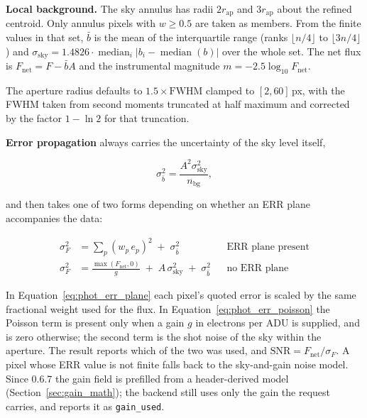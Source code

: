 \documentclass[11pt,a4paper]{article}
\newcommand{\code}[1]{\texttt{\small #1}}
\begin{document}
    \textbf{Local background.} The sky annulus has radii $2 r_{\text{ap}}$ and $3 r_{\text{ap}}$ about the refined centroid. Only annulus pixels with $w \ge 0.5$ are taken as members. From the finite values in that set, $\bar{b}$ is the mean of the interquartile range (ranks $\lfloor n/4 \rfloor$ to $\lfloor 3n/4 \rfloor$) and $\sigma_{\text{sky}} = 1.4826 \cdot \operatorname{median}_i \left| b_i - \operatorname{median}(b) \right|$ over the whole set. The net flux is $F_{\text{net}} = F - \bar{b} A$ and the instrumental magnitude $m = -2.5 \log_{10} F_{\text{net}}$.

    The aperture radius defaults to $1.5 \times \text{FWHM}$ clamped to $[2, 60]$\,px, with the FWHM taken from second moments truncated at half maximum and corrected by the factor $1 - \ln 2$ for that truncation.

    \textbf{Error propagation} always carries the uncertainty of the sky level itself,

    \begin{equation}
        \sigma^2_{\bar{b}} = \frac{A^2 \sigma^2_{\text{sky}}}{n_{\text{bg}}},
    \end{equation}

    and then takes one of two forms depending on whether an ERR plane accompanies the data:

    \begin{align}
        \sigma^2_F &= \sum_{p} \left(w_p \, e_p\right)^2 \;+\; \sigma^2_{\bar{b}}
            && \text{ERR plane present} \label{eq:phot_err_plane} \\[4pt]
        \sigma^2_F &= \frac{\max(F_{\text{net}}, 0)}{g} \;+\; A\,\sigma^2_{\text{sky}} \;+\; \sigma^2_{\bar{b}}
            && \text{no ERR plane} \label{eq:phot_err_poisson}
    \end{align}

    In Equation~\ref{eq:phot_err_plane} each pixel's quoted error is scaled by the same fractional weight used for the flux. In Equation~\ref{eq:phot_err_poisson} the Poisson term is present only when a gain $g$ in electrons per ADU is supplied, and is zero otherwise; the second term is the shot noise of the sky within the aperture. The result reports which of the two was used, and $\text{SNR} = F_{\text{net}} / \sigma_F$. A pixel whose ERR value is not finite falls back to the sky-and-gain noise model. Since 0.6.7 the gain field is prefilled from a header-derived model (Section~\ref{sec:gain_math}); the backend still uses only the gain the request carries, and reports it as \code{gain\_used}.
\end{document}
